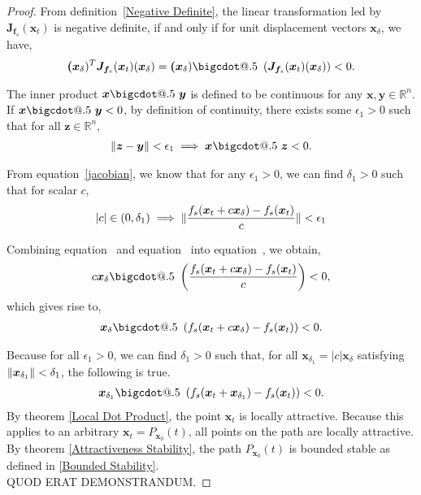 \documentclass{article}
\makeatletter
\newcommand{\B}[1]{\boldsymbol{#1}}
\newcommand*\bigcdot{\mathpalette\bigcdot@{.5}}
\newcommand*\bigcdot@[2]{\mathbin{\vcenter{\hbox{\scalebox{#2}{$\m@th#1\bullet$}}}}}
\DeclarePairedDelimiter\abs{\lvert}{\rvert}%
\DeclarePairedDelimiter\norm{\lVert}{\rVert}%
\theoremstyle{definition}
\theoremstyle{remark}
\makeatother
\begin{document}
\begin{proof}
  \label{final}
  From definition~\ref{Negative Definite}, the linear transformation led by $\B{J}_{\B{f}_s}(\B{x}_t)$
  is negative definite, if and only if for unit displacement vectors $\B{x}_\delta$, we have,
  \begin{align}
  \B(\B{x}_\delta)^T\B{J}_{\B{f}_s}(\B{x}_t)(\B{x}_\delta) =\B(\B{x}_\delta)  \bigcdot~ \left(\B{J}_{\B{f}_s}(\B{x}_t)(\B{x}_\delta)\right) < 0. \label{eq:jacobian-dot-product}
  \end{align}
  
  The inner product $\B{x}  \bigcdot~ \B{y}$ is defined to be continuous for any $\B{x}, \B{y} \in \mathbb{R}^n$.
  If $\B{x}  \bigcdot~ \B{y} < 0$, by definition of continuity, there exists some $\epsilon_1 > 0$ such that for all $\B{z} \in \mathbb{R}^n$,
  \begin{align}
    \norm{\B{z} - \B{y}} < \epsilon_1 \implies \B{x}  \bigcdot~ \B{z} < 0.  \label{eq:1}
  \end{align}
  
  From equation~\ref{jacobian}, we know that for any $\epsilon_1 > 0$, we can find $\delta_1 > 0$
  such that for scalar $c$,
  \begin{align}
    \abs{c} \in (0, \delta_1) \implies \norm{\frac{f_s(\B{x}_t + c \B{x}_\delta) - f_s(\B{x}_t)}{c}} < \epsilon_1 \label{eq:2}
  \end{align}
  
  Combining equation~ and equation~ into equation~, we obtain,
  \begin{align}
    c\B{x}_\delta  \bigcdot~ \left(\frac{f_s(\B{x}_t + c \B{x}_\delta) - f_s(\B{x}_t)}{c}\right) < 0,\nonumber\\
  \end{align}
  which gives rise to,
  \begin{align}
    \B{x}_\delta  \bigcdot~ \left(f_s(\B{x}_t + c \B{x}_\delta) - f_s(\B{x}_t)\right) < 0.
  \end{align}
    
  Because for all $\epsilon_1 > 0$, we can find $\delta_1 > 0$ such that, for all $\B{x}_{\delta_1} = |c|\B{x}_{\delta}$   
  satisfying $\norm{\B{x}_{\delta_1}} < \delta_1$, the following is true.
  \begin{align}
    \B{x}_{\delta_1}  \bigcdot~ \left(f_s(\B{x}_t + \B{x}_{\delta_1}) - f_s(\B{x}_t)\right) < 0.
  \end{align}
  By theorem \ref{Local Dot Product}, the point $\B{x}_t$ is locally attractive. Because this applies to an arbitrary $\B{x}_t = P_{\B{x}_0}(t)$,
  all points on the path are locally attractive. By theorem \ref{Attractiveness Stability},
  the path $P_{\B{x}_0}(t)$ is bounded stable as defined in \ref{Bounded Stability}.\\  
  QUOD ERAT DEMONSTRANDUM.
\end{proof}
\end{document}
